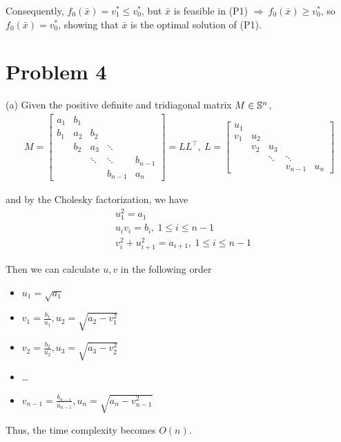 \documentclass[11pt]{article}
\newcommand{\T}{^\top}          %
\begin{document}
Consequently, $f_0(\bar{x})=v_1^* \leq v_0^*$, but $\bar{x}$ is feasible in (P1) $\Rightarrow\ f_0(\bar{x}) \geq v_0^*$, so $f_0(\bar{x})=v_0^*$, showing that $\bar{x}$ is the optimal solution of (P1).


\clearpage
\section*{Problem 4}

(a)
Given the positive definite and tridiagonal matrix $M\in{{\mathbb{S}}}^n$,
\begin{align*}
  M = 
  \begin{bmatrix}
    a_1 & b_1 &     &   & \\
    b_1 & a_2 & b_2 &   & \\
        & b_2 & a_3 &\ddots&\\
        &     &\ddots&\ddots& b_{n-1}\\
        &     &     & b_{n-1} & a_n
  \end{bmatrix}
  = LL\T, \ 
  L = 
  \begin{bmatrix}
    u_1 &     &     & \\
    v_1 & u_2 &     & \\
        & v_2 & u_3 & \\
        &     & \ddots & \ddots \\
        &     & & v_{n-1} & u_n
  \end{bmatrix}
\end{align*}

and by the Cholesky factorization, we have
\begin{align*}
  & u_1^2 = a_1\\
  & u_i v_i = b_i, \ 1\leq i\leq n-1\\
  & v_i^2 + u_{i+1}^2 = a_{i+1}, \ 1 \leq i\leq n-1
\end{align*}

Then we can calculate $u, v$ in the following order
\begin{itemize}
  \item $u_1 = \sqrt{a_1}$
  \item $v_1 = \frac{b_1}{u_1}, u_2 = \sqrt{a_2 - v_1^2}$
  \item $v_2 = \frac{b_2}{u_2}, u_3 = \sqrt{a_3 - v_2^2}$
  \item \dots
  \item $v_{n-1} = \frac{b_{n-1}}{u_{n-1}}, u_n = \sqrt{a_n - v_{n-1}^2}$
\end{itemize}

Thus, the time complexity becomes $O(n)$.
\end{document}
